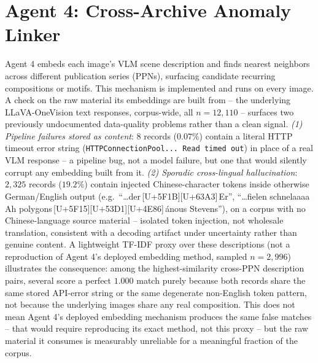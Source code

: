 \documentclass[12pt,a4paper]{report}
\begin{document}
\section{Agent 4: Cross-Archive Anomaly Linker}
\label{sec:agent4_linking}
Agent 4 embeds each image's VLM scene description and finds nearest neighbors across different publication series (PPNs), surfacing candidate recurring compositions or motifs. This mechanism is implemented and runs on every image. A check on the raw material its embeddings are built from -- the underlying LLaVA-OneVision text responses, corpus-wide, all $n=12{,}110$ -- surfaces two previously undocumented data-quality problems rather than a clean signal. \textit{(1) Pipeline failures stored as content}: $8$ records ($0.07\%$) contain a literal HTTP timeout error string (\texttt{HTTPConnectionPool... Read timed out}) in place of a real VLM response -- a pipeline bug, not a model failure, but one that would silently corrupt any embedding built from it. \textit{(2) Sporadic cross-lingual hallucination}: $2{,}325$ records ($19.2\%$) contain injected Chinese-character tokens inside otherwise German/English output (e.g.\ ``\ldots der\,[U+5F1B][U+63A3]\,Er'', ``\ldots fielen schnelaaaa Ah polygons\,[U+5F15][U+53D1][U+4E86]\,ánous Stevens''), on a corpus with no Chinese-language source material -- isolated token injection, not wholesale translation, consistent with a decoding artifact under uncertainty rather than genuine content. A lightweight TF-IDF proxy over these descriptions (not a reproduction of Agent 4's deployed embedding method, sampled $n=2{,}996$) illustrates the consequence: among the highest-similarity cross-PPN description pairs, several score a perfect $1.000$ match purely because both records share the same stored API-error string or the same degenerate non-English token pattern, not because the underlying images share any real composition. This does not mean Agent 4's deployed embedding mechanism produces the same false matches -- that would require reproducing its exact method, not this proxy -- but the raw material it consumes is measurably unreliable for a meaningful fraction of the corpus.
\end{document}
